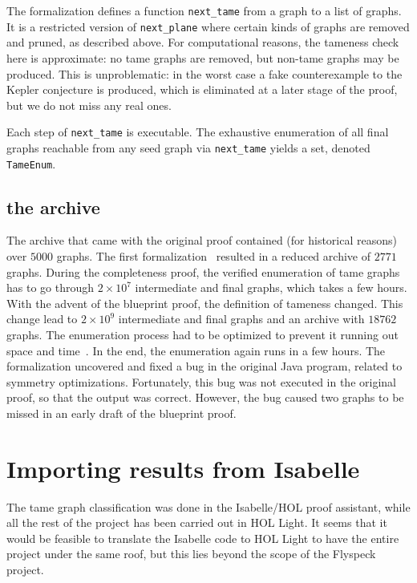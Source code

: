 The formalization defines a function \verb!next_tame! from a graph to
a list of graphs. It is a restricted version of \verb!next_plane!
where certain kinds of graphs are removed and pruned, as described
above.  For computational reasons, the tameness check here is
approximate: no tame graphs are removed, but non-tame graphs may be
produced. This is unproblematic: in the worst case a fake
counterexample to the Kepler conjecture is produced, which is
eliminated at a later stage of the proof, but we do not miss any real
ones.

Each step of \verb!next_tame! is executable. The exhaustive
enumeration of all final graphs reachable from any seed graph via
\verb!next_tame!  yields a set, denoted \verb!TameEnum!.

\subsection{the archive}
\label{Archive}

The archive that came with the original proof contained (for historical
reasons) over $5000$ graphs. The first
formalization~\cite{NipkowBS-IJCAR06} resulted in a reduced archive of
$2771$ graphs. During the completeness proof, the verified enumeration
of tame graphs has to go through $2\times 10^7$ intermediate and final
graphs, which takes a few hours. With the advent of the blueprint
proof, the definition of tameness changed. This change lead to $2
\times 10^9$ intermediate and final graphs and an archive with $18762$
graphs. The enumeration process had to be optimized to prevent it
running out space and time~\cite{Nipkow-ITP11}. In the end, the
enumeration again runs in a few hours.  The formalization uncovered
and fixed a bug in the original Java program, related to symmetry
optimizations.  Fortunately, this bug was not executed in the original
proof, so that the output was correct.  However, the bug caused two
graphs to be missed in an early draft of the blueprint proof.


\section{Importing results from Isabelle}


The tame graph classification was done in the Isabelle/HOL proof
assistant, while all the rest of the project has been carried out in
HOL Light.  It seems that it would be feasible to translate the
Isabelle code to HOL Light to have the entire project under the same
roof, but this lies beyond the scope of the Flyspeck project.

